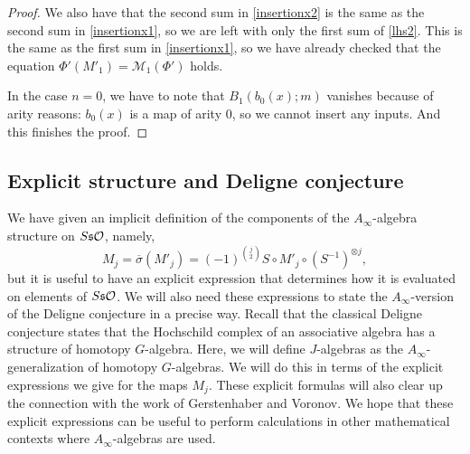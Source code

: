 \documentclass[Thesis.tex]{subfiles}
\begin{document}
\begin{proof}
 We also have that the second sum in \cref{insertionx2} is the same as the second sum in \cref{insertionx1}, so we are left with only the first sum of \cref{lhs2}. This is the same as the first sum in \cref{insertionx1}, so we have already checked that the equation $\Phi'(M'_1)=\mathcal{M}_1(\Phi')$ holds. 
  
 In the case $n=0$, we have to note that $B_1(b_0(x);m)$ vanishes because of arity reasons: $b_0(x)$ is a map of arity 0, so we cannot insert any inputs. And this finishes the proof.
 \end{proof}
 
 \subsection{Explicit structure and Deligne conjecture}\label{sect4}


We have given an implicit definition of the components of the $A_\infty$-algebra structure on $S\mathfrak{s}{\mathcal O}$, namely, \[M_j=\overline{\sigma}(M'_j)=(-1)^{\binom{j}{2}}S\circ M'_j\circ(S^{-1})^{\otimes j},\]
but it is useful to have an explicit expression that determines how it is evaluated on elements of $S\mathfrak{s}{\mathcal O}$. We will also need these expressions to state the $A_\infty$-version of the Deligne conjecture in a precise way. Recall that the classical Deligne conjecture \cite{GV} states that the Hochschild complex of an associative algebra has a structure of homotopy $G$-algebra. Here, we will define $J$-algebras as the $A_\infty$-generalization of homotopy $G$-algebras. We will do this in terms of the explicit expressions we give for the maps $M_j$. These explicit formulas will also clear up the connection with the work of Gerstenhaber and Voronov. We hope that these explicit expressions can be useful to perform calculations in other mathematical contexts where $A_\infty$-algebras are used.
\end{document}
